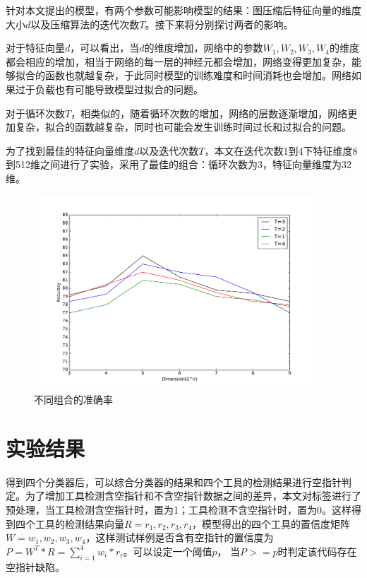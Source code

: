 针对本文提出的模型，有两个参数可能影响模型的结果：图压缩后特征向量的维度大小$d$以及压缩算法的迭代次数$T$。接下来将分别探讨两者的影响。


对于特征向量$d$，可以看出，当$d$的维度增加，网络中的参数$W_1, W_2, W_3, W_4$的维度都会相应的增加，相当于网络的每一层的神经元都会增加，网络变得更加复杂，能够拟合的函数也就越复杂，于此同时模型的训练难度和时间消耗也会增加。网络如果过于负载也有可能导致模型过拟合的问题。

对于循环次数$T$，相类似的，随着循环次数的增加，网络的层数逐渐增加，网络更加复杂，拟合的函数越复杂，同时也可能会发生训练时间过长和过拟合的问题。

为了找到最佳的特征向量维度$d$以及迭代次数$T$，本文在迭代次数1到4下特征维度8到512维之间进行了实验，采用了最佳的组合：循环次数为3，特征向量维度为32维。
\begin{figure}[htbp]
	\begin{center}
		\includegraphics[width=0.95\textwidth]{figures//9.pdf}
		\caption{不同组合的准确率}
		\label{default}
	\end{center}
\end{figure}
\section{实验结果}
得到四个分类器后，可以综合分类器的结果和四个工具的检测结果进行空指针判定。为了增加工具检测含空指针和不含空指针数据之间的差异，本文对标签进行了预处理，当工具检测含空指针时，置为1；工具检测不含空指针时，置为0。这样得到四个工具的检测结果向量$R={r_1, r_2, r_3, r_4}$，模型得出的四个工具的置信度矩阵$W={w_1, w_2, w_3, w_4}$，这样测试样例是否含有空指针的置信度为$P = W^T*R = \sum_{i=1}^4 w_i*r_i$。可以设定一个阈值$p$， 当$P>=p$时判定该代码存在空指针缺陷。

